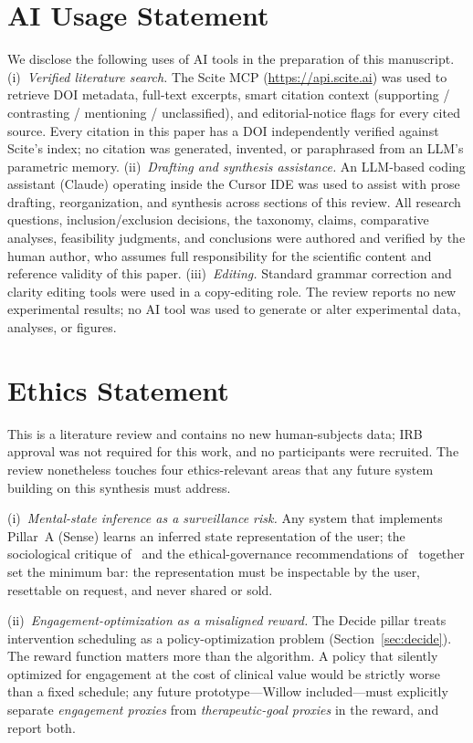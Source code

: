 \documentclass[11pt,a4paper]{article}
\newcommand{\secref}[1]{Section~\ref{#1}}
\begin{document}
\section*{AI Usage Statement}\label{sec:ai-usage}
We disclose the following uses of AI tools in the preparation of
this manuscript.
(i)~\textit{Verified literature search.} The Scite MCP
(\url{https://api.scite.ai}) was used to retrieve DOI metadata,
full-text excerpts, smart citation context (supporting /
contrasting / mentioning / unclassified), and editorial-notice
flags for every cited source. Every citation in this paper has a
DOI independently verified against Scite's index; no citation was
generated, invented, or paraphrased from an LLM's parametric
memory.
(ii)~\textit{Drafting and synthesis assistance.} An LLM-based
coding assistant (Claude) operating inside the Cursor IDE was used
to assist with prose drafting, reorganization, and synthesis
across sections of this review. All research questions,
inclusion/exclusion decisions, the taxonomy, claims, comparative
analyses, feasibility judgments, and conclusions were authored and
verified by the human author, who assumes full responsibility for
the scientific content and reference validity of this paper.
(iii)~\textit{Editing.} Standard grammar correction and clarity
editing tools were used in a copy-editing role.
The review reports no new experimental results; no AI tool was
used to generate or alter experimental data, analyses, or figures.

\section*{Ethics Statement}\label{sec:ethics-statement}
This is a literature review and contains no new human-subjects
data; IRB approval was not required for this work, and no
participants were recruited. The review nonetheless touches four
ethics-relevant areas that any future system building on this
synthesis must address.

(i)~\emph{Mental-state inference as a surveillance risk.} Any
system that implements Pillar~A (Sense) learns an inferred state
representation of the user; the sociological critique
of~\cite{BirkSamuel2020DigitalPhenotypingCritique} and the
ethical-governance recommendations
of~\cite{MartinezMartin2021DigitalPhenotypingEthics} together set
the minimum bar: the representation must be inspectable by the
user, resettable on request, and never shared or sold.

(ii)~\emph{Engagement-optimization as a misaligned reward.} The
Decide pillar treats intervention scheduling as a
policy-optimization problem (\secref{sec:decide}). The reward
function matters more than the algorithm. A policy that silently
optimized for engagement at the cost of clinical value would be
strictly worse than a fixed schedule; any future
prototype---Willow included---must explicitly separate
\emph{engagement proxies} from \emph{therapeutic-goal proxies} in
the reward, and report both.
\end{document}
